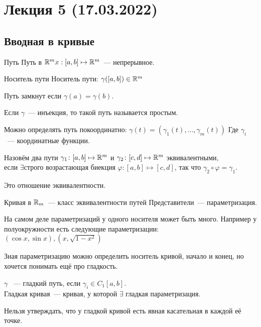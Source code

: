 \section*{Лекция 5 (17.03.2022)}
\subsection{Вводная в кривые}
\begin{definition}{Путь}
    Путь в $\mathbb{R}^m x : [a, b] \mapsto \mathbb{R}^m$~--- непрерывное.
\end{definition}
\begin{definition}{Носитель пути}
    Носитель пути: $\gamma([a, b])\in \mathbb{R}^m$
\end{definition}
\begin{definition}
    Путь замкнут если $\gamma(a) = \gamma(b)$.
\end{definition}
\begin{definition}
    Если $\gamma$~--- инъекция, то такой путь называется
    простым.
\end{definition}
\begin{remark}
    Можно определять путь покоординатно:
    $\gamma(t) = (\gamma_1(t),\dots, \gamma_m(t))$ 
    Где $\gamma_i$~--- координатные функции.
\end{remark}
\begin{definition}
    Назовём два пути $\gamma_1\colon [a,b]\mapsto \mathbb{R}^m$ и
    $\gamma_2\colon [c,d]\mapsto \mathbb{R}^m$ эквивалентными,\\
    если $\exists \text{строго возрастающая биекция }
    \varphi\colon [a,b]\mapsto[c, d]$, так что 
    $\gamma_2\circ \varphi = \gamma_1$.
\end{definition}
\begin{remark}
    Это отношение эквивалентности.
\end{remark}
\begin{definition}
    Кривая в $\mathbb{R}_m$~--- класс эквивалентности путей
    Представители~--- параметризация.
\end{definition}
\begin{remark}
    На самом деле параметризаций у одного носителя может быть
    много. Например у полуокружности есть следующие параметризации:
    $(\cos x, \sin x), (x, \sqrt{1 - x^2})$
\end{remark}
\begin{remark}
    Зная параметризацию можно определить носитель кривой,
    начало и конец, но хочется понимать ещё про гладкость.
\end{remark}
\begin{definition}
    $\gamma$ ~--- гладкий путь, если $\gamma_i\in C_1[a,b]$.\\
    Гладкая кривая~--- кривая, у которой $\exists$ гладкая
    параметризация.
\end{definition}
\begin{remark}
    Нельзя утверждать, что у гладкой кривой есть явная касательная
    в каждой её точке.
\end{remark}
